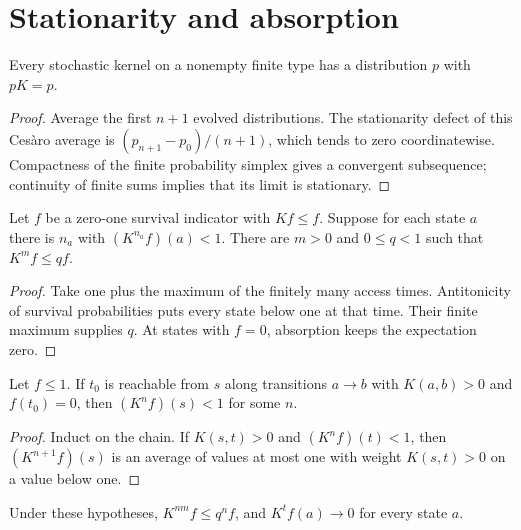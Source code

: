 \section{Stationarity and absorption}
\begin{theorem}\label{thm:stationary}
\leanok{}
Every stochastic kernel on a nonempty finite type has a distribution $p$ with $pK=p$.
\end{theorem}
\begin{proof}\leanok
Average the first $n+1$ evolved distributions. The stationarity defect of this
Ces\`aro average is $(p_{n+1}-p_0)/(n+1)$, which tends to zero coordinatewise.
Compactness of the finite probability simplex gives a convergent subsequence;
continuity of finite sums implies that its limit is stationary.
\end{proof}
\begin{lemma}\label{lem:block}
\leanok{}
Let $f$ be a zero-one survival indicator with $Kf\le f$. Suppose for each
state $a$ there is $n_a$ with $(K^{n_a}f)(a)<1$. There are $m>0$ and
$0\le q<1$ such that $K^m f\le qf$.
\end{lemma}
\begin{proof}\leanok
Take one plus the maximum of the finitely many access times. Antitonicity of
survival probabilities puts every state below one at that time. Their finite
maximum supplies $q$. At states with $f=0$, absorption keeps the expectation zero.
\end{proof}
\begin{lemma}\label{lem:reachable-access}
\leanok{}
Let $f\le1$. If $t_0$ is reachable from $s$ along transitions $a\to b$ with
$K(a,b)>0$ and $f(t_0)=0$, then $(K^n f)(s)<1$ for some $n$.
\end{lemma}
\begin{proof}\leanok
Induct on the chain. If $K(s,t)>0$ and $(K^n f)(t)<1$, then $(K^{n+1}f)(s)$ is an average of
values at most one with weight $K(s,t)>0$ on a value below one.
\end{proof}
\begin{theorem}\label{thm:absorption}
\leanok{}
Under these hypotheses, $K^{nm}f\le q^n f$, and $K^t f(a)\to0$ for every state $a$.
\end{theorem}
